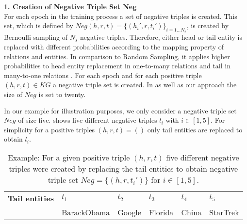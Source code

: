 \textbf{1. Creation of Negative Triple Set Neg}\\
For each epoch in the training process a set of negative triples is created.
This set, which is defined by $Neg(h,r,t)=\{(h_i',r,t_i')\}_{i=1\dots N_s}$, is created by Bernoulli sampling of $N_s$ negative triples.
Therefore, either head or tail entity is replaced with different probabilities according to the mapping property of relations and entities.
In comparison to Random Sampling, it applies higher probabilities to head entity replacement in one-to-many relations and tail in many-to-one relations \cite{qiannegative}.
For each epoch and for each positive triple $(h,r,t) \in KG$ a negative triple set is created.
In \kbgan as well as our approach the size of $Neg$ is set to twenty.

In our example for illustration purposes, we only consider a negative triple set $Neg$ of size five.
 shows five different negative triples $l_i$ with $i \in [1,5]$.
For simplicity for a positive triples $(h,r,t) = (\text{})$
only tail entities are replaced to obtain $l_i$. 
\begin{table}[h]
    \centering
    \begin{tabular}{llllll}
        \toprule
        
        \textbf{Tail entities}
        & \textbf{$t_1$} & \textbf{$t_2$} & \textbf{$t_3$} & \textbf{$t_4$} & \textbf{$t_5$} \\
        
        & BarackObama 
        & Google  
        & Florida 
        & China 
        & StarTrek\\

        \bottomrule
    \end{tabular}
    \caption{Example: For a given positive triple $(h,r,t)$ five different negative triples were created by replacing the tail entities to obtain negative triple set 
    $Neg = \{(h,r,t_i')\}$ for $i \in [1,5]$.}
\label{tab:neg_example}
\end{table}